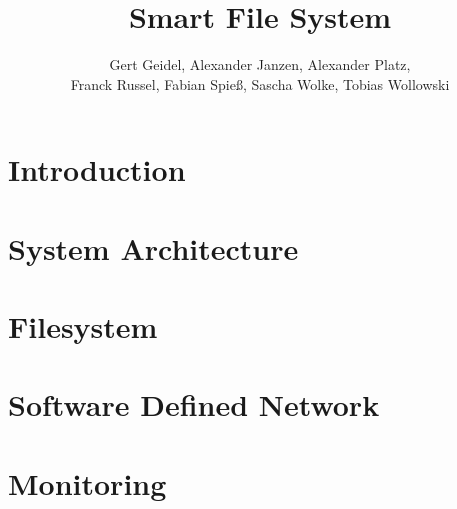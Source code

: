 \documentclass[journal]{IEEEtran}
\begin{document}
\title{Smart File System}

\author{Gert Geidel, Alexander Janzen, Alexander Platz, \\ Franck Russel, Fabian Spie\ss, Sascha Wolke, Tobias Wollowski}


\maketitle





\begin{abstract}




\end{abstract}



\IEEEpeerreviewmaketitle







\section{Introduction}
\label{sec:intro}


\section{System Architecture}





\section{Filesystem}





\section{Software Defined Network}
\label{sec:sdn}




\section{Monitoring}
\end{document}
